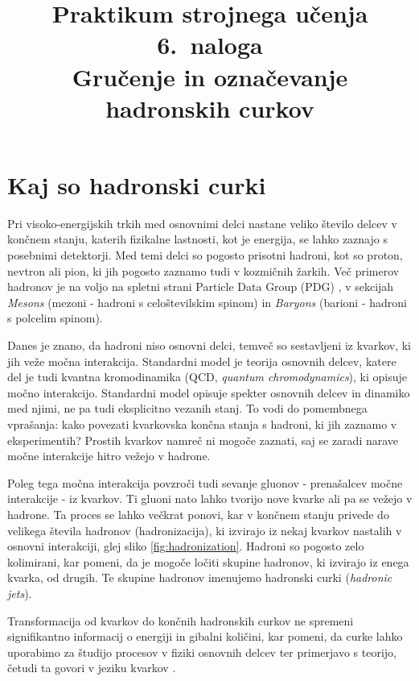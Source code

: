 \documentclass[slovene,11pt,a4paper]{article}
\title{
\sc\large Praktikum strojnega učenja\\
\bigskip
\bf\Large 6.~naloga\\ Gručenje in označevanje hadronskih curkov
}
\author{}
\date{}
\begin{document}
\maketitle
\vspace{-1cm}

\section*{Kaj so hadronski curki}

Pri visoko-energijskih trkih med osnovnimi delci nastane veliko število delcev v končnem stanju, katerih fizikalne lastnosti, kot je energija, se lahko zaznajo s posebnimi detektorji. Med temi delci so pogosto prisotni hadroni, kot so proton, nevtron ali pion, ki jih pogosto zaznamo tudi v kozmičnih žarkih. Več primerov hadronov je na voljo na spletni strani Particle Data Group (PDG) \cite{pdg}, v sekcijah \textit{Mesons} (mezoni - hadroni s celoštevilskim spinom) in \textit{Baryons} (barioni - hadroni s polcelim spinom).

Danes je znano, da hadroni niso osnovni delci, temveč so sestavljeni iz kvarkov, ki jih veže močna interakcija. Standardni model je teorija osnovnih delcev, katere del je tudi kvantna kromodinamika (QCD, \textit{quantum chromodynamics}), ki opisuje močno interakcijo. Standardni model opisuje spekter osnovnih delcev in dinamiko med njimi, ne pa tudi eksplicitno vezanih stanj. To vodi do pomembnega vprašanja: kako povezati kvarkovska končna stanja s hadroni, ki jih zaznamo v eksperimentih? Prostih kvarkov namreč ni mogoče zaznati, saj se zaradi narave močne interakcije hitro vežejo v hadrone.

Poleg tega močna interakcija povzroči tudi sevanje gluonov - prenašalcev močne interakcije - iz kvarkov. Ti gluoni nato lahko tvorijo nove kvarke ali pa se vežejo v hadrone. Ta proces se lahko večkrat ponovi, kar v končnem stanju privede do velikega števila hadronov (hadronizacija), ki izvirajo iz nekaj kvarkov nastalih v osnovni interakciji, glej sliko \ref{fig:hadronization}. Hadroni so pogosto zelo kolimirani, kar pomeni, da je mogoče ločiti skupine hadronov, ki izvirajo iz enega kvarka, od drugih. Te skupine hadronov imenujemo hadronski curki (\textit{hadronic jets}).

Transformacija od kvarkov do končnih hadronskih curkov ne spremeni signifikantno informacij o energiji in gibalni količini, kar pomeni, da curke lahko uporabimo za študijo procesov v fiziki osnovnih delcev ter primerjavo s teorijo, četudi ta govori v jeziku kvarkov \cite{jetsSeymour:1995gq, jetbook}.
\end{document}
